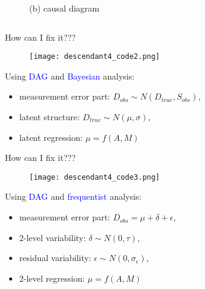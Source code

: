 \begin{frame}
\begin{columns}
\begin{column}{0.5\textwidth}
\begin{figure}
				\caption*{(b) causal diagram}
			\end{figure}
		\end{column}
	\end{columns}
\end{frame}
%
%
\begin{lhframe}[rhgraphic={\texttt{[image: descendant4\_reg3.png]}}]
	{How can I fix it???}
	
	\begin{figure}
		\texttt{[image: descendant4\_code2.png]}
	\end{figure}
	
	Using \textcolor{blue}{DAG} and \textcolor{blue}{Bayesian} analysis:
	\begin{itemize}
		\item measurement error part: $D_{obs} \sim N( D_{true}, S_{obs})$, 
		\item latent structure: $D_{true} \sim N( \mu, \sigma )$,
		\item latent regression: $\mu = f(A, M)$
	\end{itemize}
\end{lhframe}
%
%
\begin{lhframe}[rhgraphic={\texttt{[image: descendant4\_reg4.png]}}]
	{How can I fix it???}
	
	\begin{figure}
		\texttt{[image: descendant4\_code3.png]}
	\end{figure}
	
	Using \textcolor{blue}{DAG} and \textcolor{blue}{frequentist} analysis:
	\begin{itemize}
		\item measurement error part: $D_{obs} = \mu + \delta + \epsilon$, 
		\item 2-level variability: $\delta \sim N(0, \tau)$,
		\item residual variability: $\epsilon \sim N(0, \sigma_{\epsilon})$,
		\item 2-level regression: $\mu = f(A, M)$
	\end{itemize}
\end{lhframe}
%
%